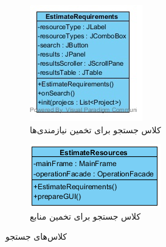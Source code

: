 \begin{figure}[H]
	\centering
	\begin{subfigure}[b]{0.4\textwidth}
		\includegraphics[width=\textwidth]{img/class-design/ui/EstimateRequirements.jpg}
		\caption{کلاس جستجو برای تخمین نیازمندی‌ها}
	\end{subfigure}
	\begin{subfigure}[b]{0.4\textwidth}
		\includegraphics[width=\textwidth]{img/class-design/ui/EstimateResources}
		\caption{کلاس جستجو برای تخمین منابع}
	\end{subfigure}
	\caption{کلاس‌های جستجو}
\end{figure}

